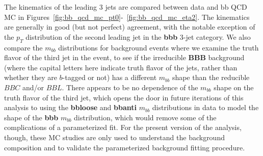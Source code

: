The kinematics of the leading 3 jets are compared between data and bb QCD MC in 
Figures~\ref{fig:bb_qcd_mc_pt0}-~\ref{fig:bb_qcd_mc_eta2}.  The kinematics are
generally in good (but not perfect) agreement, with the notable exception of the
$p_T$ distribution of the second leading jet in the \textbf{bbb} 3-jet category.
We also compare the $m_{bb}$ distributions for background events where we 
examine the truth flavor of the third jet in the event, to see if the irreducible
\textbf{BBB} background (where the capital letters here indicate truth flavor
of the jets, rather than whether they are $b$-tagged or not) has a different
$m_{bb}$ shape than the reducible $BBC$ and/or $BBL$.  There appears to be
no dependence of the $m_{bb}$ shape on the truth flavor of the third jet, which
opens the door in future iterations of this analysis to using the 
\textbf{bbloose} and \textbf{bbanti} $m_{bb}$ distributions in data to 
model the shape of the \textbf{bbb} $m_{bb}$ distribution, which would remove
some of the complications of a parameterized fit.  For the present version of the analysis, though,
these MC studies are only used to understand the background composition
and to validate the parameterized background fitting procedure.


